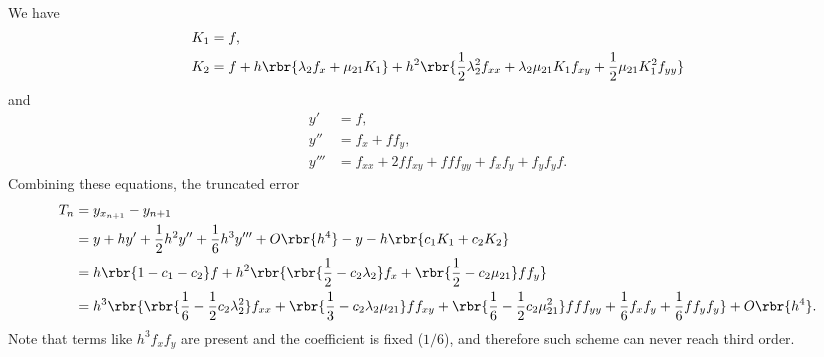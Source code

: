 \documentclass[english, nochinese]{pkupaper}
\begin{document}
\begin{thmquestion}
\ 
\begin{thmproof}
We have
\begin{align}
K_1 &= f, \\
K_2 &= f + h \rbr{ \lambda_2 f_x + \mu_{ 2 1 } K_1 } + h^2 \rbr{ \frac{1}{2} \lambda_2^2 f_{ x x } + \lambda_2 \mu_{ 2 1 } K_1 f_{ x y } + \frac{1}{2} \mu_{ 2 1 } K_1^2 f_{ y y } }
\end{align}
and
\begin{align}
y' &= f, \\
y'' &= f_x + f f_y, \\
y''' &= f_{ x x } + 2 f f_{ x y } + f f f_{ y y } + f_x f_y + f_y f_y f.
\end{align}
Combining these equations, the truncated error
\begin{equation}
\begin{split}
T_n &= y_{x_{ n + 1 }} - y_{ n + 1 } \\
&= y + h y' + \frac{1}{2} h^2 y'' + \frac{1}{6} h^3 y''' + O \rbr{h^4} - y - h \rbr{ c_1 K_1 + c_2 K_2 } \\
&= h \rbr{ 1 - c_1 - c_2 } f + h^2 \rbr{ \rbr{ \frac{1}{2} - c_2 \lambda_2 } f_x + \rbr{ \frac{1}{2} - c_2 \mu_{ 2 1 } } f f_y } \\
&= h^3 \rbr{ \rbr{ \frac{1}{6} - \frac{1}{2} c_2 \lambda_2^2 } f_{ x x } + \rbr{ \frac{1}{3} - c_2 \lambda_2 \mu_{ 2 1 } } f f_{ x y } + \rbr{ \frac{1}{6} - \frac{1}{2} c_2 \mu_{ 2 1 }^2 } f f f_{ y y } + \frac{1}{6} f_x f_y + \frac{1}{6} f f_y f_y } + O \rbr{h^4}.
\end{split}
\end{equation}
Note that terms like $ h^3 f_x f_y $ are present and the coefficient is fixed ($ 1 / 6 $), and therefore such scheme can never reach third order.

\sqed
\end{thmproof}
\end{thmquestion}
\end{document}

